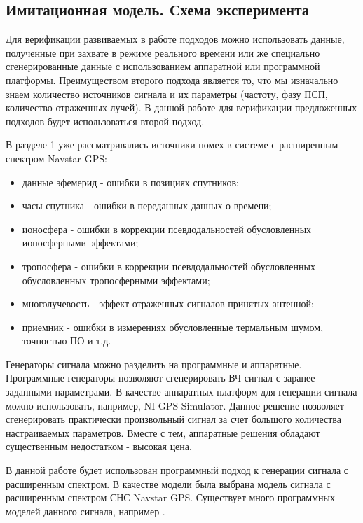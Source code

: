 \subsection{Имитационная модель. Схема эксперимента}

Для верификации развиваемых в работе подходов можно использовать данные, полученные при захвате в режиме реального времени или же
специально сгенерированные данные с использованием аппаратной или программной платформы. Преимуществом второго подхода
является то, что мы изначально знаем количество источников сигнала и их параметры (частоту, фазу ПСП, количество отраженных лучей).
В данной работе для верификации предложенных подходов будет использоваться второй подход.

В разделе 1 уже рассматривались источники помех в системе с расширенным спектром Navstar GPS:
\begin{itemize}
	\item {данные эфемерид - ошибки в позициях спутников;}
	\item {часы спутника - ошибки в переданных данных о времени;}
	\item {ионосфера - ошибки в коррекции псевдодальностей обусловленных ионосферными эффектами;}
	\item {тропосфера - ошибки в коррекции псевдодальностей обусловленных обусловленных тропосферными эффектами;}
	\item {многолучевость - эффект отраженных сигналов принятых антенной;}
	\item {приемник - ошибки в измерениях обусловленные термальным шумом, точностью ПО и т.д.}
\end{itemize}

Генераторы сигнала можно разделить на программные и аппаратные. Программные генераторы позволяют сгенерировать
ВЧ сигнал с заранее заданными параметрами. В качестве аппаратных платформ для генерации сигнала можно использовать, например,
NI GPS Simulator. Данное решение позволяет сгенерировать практически произвольный сигнал за
счет большого количества настраиваемых параметров. Вместе с тем, аппаратные решения обладают существенным недостатком - высокая цена.

В данной работе будет использован программный подход к генерации сигнала с расширенным спектром. В качестве модели была выбрана модель
сигнала с расширенным спектром СНС Navstar GPS. Существует много программных моделей данного сигнала,
например \cite{hannah_phd, burns_model, corbell_model, crs_model, brown_model}.

